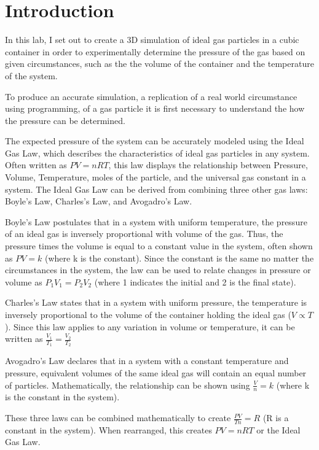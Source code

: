 \documentclass[]{article}
\author{Luke Carlson}
\begin{document}
\newcommand{\truncateit}


\newcommand{\scititle}

\section{Introduction}

In this lab, I set out to create a 3D simulation of ideal gas particles
in a cubic container in order to experimentally determine the pressure
of the gas based on given circumstances, such as the the volume of the
container and the temperature of the system.

To produce an accurate simulation, a replication of a real world
circumstance using programming, of a gas particle it is first necessary
to understand the how the pressure can be determined.

The expected pressure of the system can be accurately modeled using the
Ideal Gas Law, which describes the characteristics of ideal gas
particles in any system. Often written as $PV=nRT$, this law displays
the relationship between Pressure, Volume, Temperature, moles of the
particle, and the universal gas constant in a system. The Ideal Gas Law
can be derived from combining three other gas laws: Boyle's Law,
Charles's Law, and Avogadro's Law.

Boyle's Law postulates that in a system with uniform temperature, the
pressure of an ideal gas is inversely proportional with volume of the
gas. Thus, the pressure times the volume is equal to a constant value in
the system, often shown as $PV = k$ (where k is the constant). Since the
constant is the same no matter the circumstances in the system, the law
can be used to relate changes in pressure or volume as
$P_{1}V_{1} = P_{2}V_{2}$ (where 1 indicates the initial and 2 is the
final state).

Charles's Law states that in a system with uniform pressure, the
temperature is inversely proportional to the volume of the container
holding the ideal gas ($V \propto T$). Since this law applies to any
variation in volume or temperature, it can be written as
$\frac{V_{1}}{T_{1}} = \frac{V_{2}}{T_{2}}$

Avogadro's Law declares that in a system with a constant temperature and
pressure, equivalent volumes of the same ideal gas will contain an equal
number of particles. Mathematically, the relationship can be shown using
$\frac{V}{n} = k$ (where k is the constant in the system).

These three laws can be combined mathematically to create
$\frac{PV}{Tn} = R$ (R is a constant in the system). When rearranged,
this creates $PV=nRT$ or the Ideal Gas Law.
\end{document}
